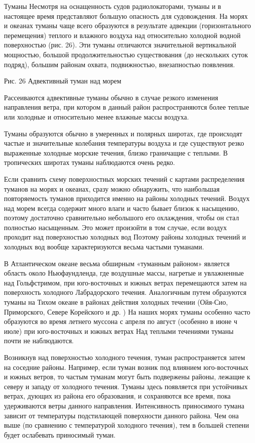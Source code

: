 Туманы
Несмотря на оснащенность судов радиолокаторами, туманы и в настоящее время представляют большую опасность для судовождения. На морях и океанах туманы чаще всего образуются в результате адвекции (горизонтального перемещения) теплого и влажного воздуха над относительно холодной водной поверхностью (рис. 26). Эти туманы отличаются значительной вертикальной мощностью, большой продолжительностью существования (до нескольких суток подряд), большим районам охвата, подвижностью, внезапностью появления.


Рис. 26 Адвективный туман над морем

Рассеиваются адвективные туманы обычно в случае резкого изменения направления ветра, при котором в данный район распространяются более теплые или холодные и относительно менее влажные массы воздуха.

Туманы образуются обычно в умеренных и полярных широтах, где происходят частые и значительные колебания температуры воздуха и где существуют резко выраженные холодные морские течения, близко граничащие с теплыми. В тропических широтах туманы наблюдаются очень редко.

Если сравнить схему поверхностных морских течений с картами распределения туманов на морях и океанах, сразу можно обнаружить, что наибольшая повторяемость туманов приходится именно на районы холодных течений. Воздух над морем всегда содержит много влаги и часто бывает близок к насыщению, поэтому достаточно сравнительно небольшого его охлаждения, чтобы он стал полностью насыщенным. Это может произойти в том случае, если воздух проходит над поверхностью холодных вод Поэтому районы холодных течений и холодных вод вообще характеризуются весьма частыми туманами.

В Атлантическом океане весьма обширным «туманным районом» является область около Ньюфаундленда, где воздушные массы, нагретые и увлажненные над Гольфстримом, при юго-восточных и южных ветрах перемещаются затем на поверхность холодного Лабрадорского течения. Аналогичным путем образуются туманы на Тихом океане в районах действия холодных течении (Ойя-Сио, Приморского, Севере Корейского и др. ) На наших морях туманы особенно часто образуются во время летнего муссона с апреля по август (особенно в июне ч июле) при юго-восточных и южных ветрах Над теплыми течениями туманы почти не наблюдаются.

Возникнув над поверхностью холодного течения, туман распространяется затем на соседние районы. Например, если туман возник под влиянием юго-восточных и южных ветров, то частым туманам могут быть подвержены районы, лежащие к северу и западу от холодного течения. Туманы здесь появляется при устойчивых ветрах, дующих из района его образования, и сохраняются все время, пока удерживаются ветры данного направления. Интенсивность приносимого тумана зависит от температуры подстилающей поверхности данного района. Чем она выше (по сравнению с температурой холодного течения), тем в большей степени будет ослабевать приносимый туман.


